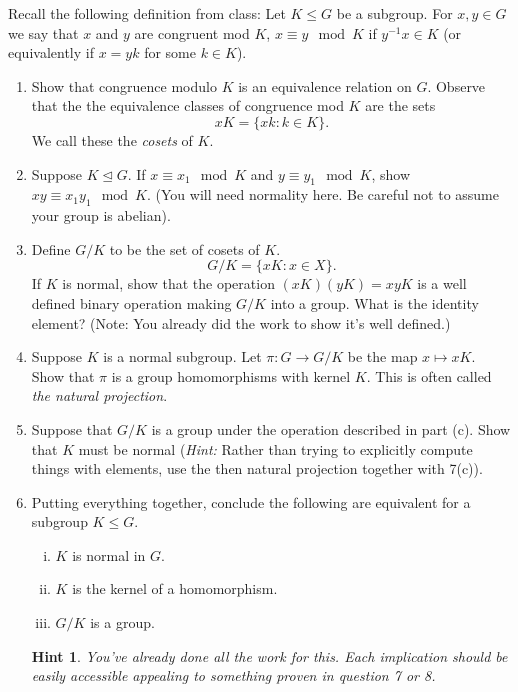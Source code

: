 \documentclass[11pt]{article}
\newtheorem*{hint}{Hint}
\begin{document}
\begin{enumerate}
  Recall the following definition from class: Let $K\le G$ be a subgroup.  For $x,y\in G$  we say that $x$ and $y$ are congruent mod $K$, $x\equiv y\mod K$ if $y^{-1}x\in K$ (or equivalently if $x=yk$ for some $k\in K$).
  \begin{enumerate}
    \item Show that congruence modulo $K$ is an equivalence relation on $G$.  Observe that the the equivalence classes of congruence mod $K$ are the sets
    \[xK = \{xk:k\in K\}.\]
    We call these the \textit{cosets} of $K$.
    \item Suppose $K\unlhd G$.  If $x\equiv x_1\mod K$ and $y\equiv y_1\mod K$, show $xy\equiv x_1y_1\mod K$.  (You will need normality here.  Be careful not to assume your group is abelian).
    \item Define $G/K$ to be the set of cosets of $K$.
     \[G/K = \{xK:x\in X\}.\]
     If $K$ is normal, show that the operation $(xK)(yK) = xyK$ is a well defined binary operation making $G/K$ into a group.  What is the identity element?  (Note: You already did the work to show it's well defined.)
    \item Suppose $K$ is a normal subgroup.  Let $\pi:G\to G/K$ be the map $x\mapsto xK$.  Show that $\pi$ is a group homomorphisms with kernel $K$.  This is often called \textit{the natural projection}.
    \item Suppose that $G/K$ is a group under the operation described in part (c).  Show that $K$ must be normal (\textit{Hint:} Rather than trying to explicitly compute things with elements, use the then natural projection together with 7(c)).
    \item Putting everything together, conclude the following are equivalent for a subgroup $K\le G$.
    \begin{enumerate}[(i)]
      \item $K$ is normal in $G$.
      \item $K$ is the kernel of a homomorphism.
      \item $G/K$ is a group.
    \end{enumerate}
    \begin{hint}
      You've already done all the work for this.  Each implication should be easily accessible appealing to something proven in question 7 or 8.
    \end{hint}
  \end{enumerate}

\end{enumerate}
\end{document}
